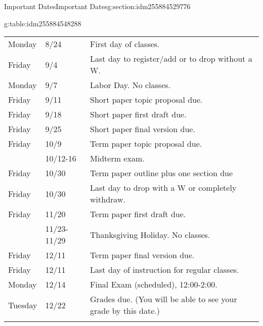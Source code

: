 \documentclass[oneside,10pt,]{article}
\newcommand{\tabularfont}{\relax}
\newcommand{\hrulethick} {\noalign{\hrule height 0.11em}}
\begin{document}
%
%
\typeout{************************************************}
\typeout{************************************************}
%
\begin{sectionptx}{Important Dates}{}{Important Dates}{}{}{g:section:idm255884529776}
\begin{tableptx}{\textbf{}}{g:table:idm255884548288}{}%
\centering
{\tabularfont%
\begin{tabular}{lll}\hrulethick
Monday&8\slash{}24&First day of classes.\tabularnewline[0pt]
Friday&9\slash{}4&Last day to register\slash{}add or to drop without a W.\tabularnewline[0pt]
Monday&9\slash{}7&Labor Day. No classes.\tabularnewline[0pt]
Friday&9\slash{}11&Short paper topic proposal due.\tabularnewline[0pt]
Friday&9\slash{}18&Short paper first draft due.\tabularnewline[0pt]
Friday&9\slash{}25&Short paper final version due.\tabularnewline[0pt]
Friday&10\slash{}9&Term paper topic proposal due.\tabularnewline[0pt]
&10\slash{}12-16&Midterm exam.\tabularnewline[0pt]
Friday&10\slash{}30&Term paper outline plus one section due\tabularnewline[0pt]
Friday&10\slash{}30&Last day to drop with a W or completely withdraw.\tabularnewline[0pt]
Friday&11\slash{}20&Term paper first draft due.\tabularnewline[0pt]
&11\slash{}23-11\slash{}29&Thanksgiving Holiday. No classes.\tabularnewline[0pt]
Friday&12\slash{}11&Term paper final version due.\tabularnewline[0pt]
Friday&12\slash{}11&Last day of instruction for regular classes.\tabularnewline[0pt]
Monday&12\slash{}14&Final Exam (scheduled), 12:00-2:00.\tabularnewline[0pt]
Tuesday&12\slash{}22&Grades due. (You will be able to see your grade by this date.)\tabularnewline\hrulethick
\end{tabular}
}%
\end{tableptx}%
\end{sectionptx}
%
%
\typeout{************************************************}
\typeout{************************************************}
%
\end{document}
